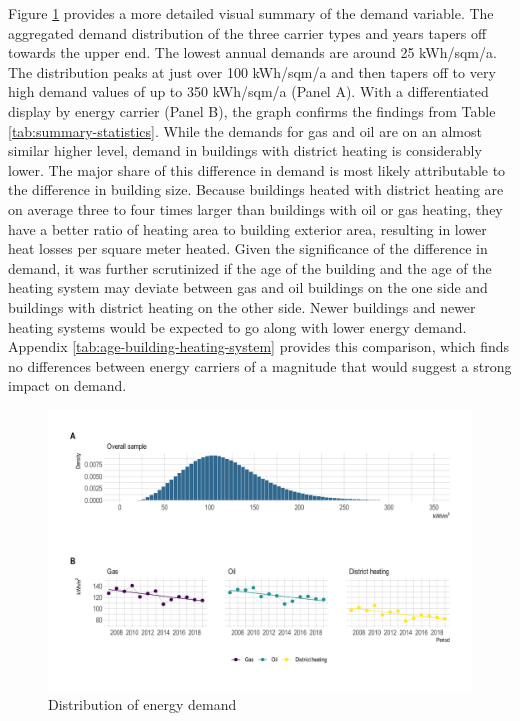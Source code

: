 \documentclass[12pt,twoside]{reedthesis}
\begin{document}
Figure \ref{fig:demand-descriptive-graph} provides a more detailed visual summary of the demand variable. The aggregated demand distribution of the three carrier types and years tapers off towards the upper end. The lowest annual demands are around 25 kWh/sqm/a. The distribution peaks at just over 100 kWh/sqm/a and then tapers off to very high demand values of up to 350 kWh/sqm/a (Panel A). With a differentiated display by energy carrier (Panel B), the graph confirms the findings from Table \ref{tab:summary-statistics}. While the demands for gas and oil are on an almost similar higher level, demand in buildings with district heating is considerably lower. The major share of this difference in demand is most likely attributable to the difference in building size. Because buildings heated with district heating are on average three to four times larger than buildings with oil or gas heating, they have a better ratio of heating area to building exterior area, resulting in lower heat losses per square meter heated. Given the significance of the difference in demand, it was further scrutinized if the age of the building and the age of the heating system may deviate between gas and oil buildings on the one side and buildings with district heating on the other side. Newer buildings and newer heating systems would be expected to go along with lower energy demand. Appendix \ref{tab:age-building-heating-system} provides this comparison, which finds no differences between energy carriers of a magnitude that would suggest a strong impact on demand.
\begin{figure}

{\centering \includegraphics[width=1\linewidth]{figure/demand_descriptive} 

}

\caption{Distribution of energy demand}\label{fig:demand-descriptive-graph}
\end{figure}
\end{document}
